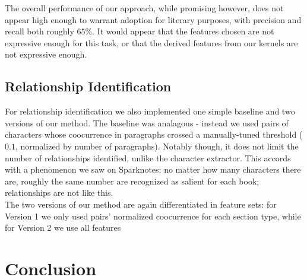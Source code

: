 \documentclass[12pt]{article}
\begin{document}
        The overall performance of our approach, while promising however, does not appear high enough to warrant
        adoption for literary purposes, with precision and recall both roughly $65\%$. It would appear
        that the features chosen are not expressive enough for this task, or that the derived features
        from our kernels are not expressive enough.  

    \subsection{Relationship Identification}

        For relationship identification we also implemented one simple baseline and two versions of our method.
        The baseline was analagous - instead we used pairs of characters whose coocurrence in paragraphs crossed 
        a manually-tuned threshold ($0.1$, normalized by number of paragraphs). Notably though, it does not
        limit the number of relationships identified, unlike the character extractor. This accords with a
        phenomenon we saw on Sparknotes: no matter how many characters there are, roughly the same number
        are recognized as salient for each book; relationships are not like this. \\

        The two versions of our method are again differentiated in feature sets: for Version 1 we only used
        pairs' normalized coocurrence for each section type, while for Version 2 we use all features 

\section{Conclusion}
\end{document}
